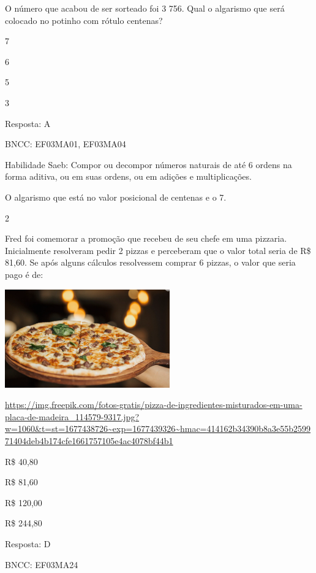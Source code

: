 \begin{escolha}
{\begin{escolha}
{O número que acabou de ser sorteado foi 3 756. Qual o algarismo que será
colocado no potinho com rótulo centenas?

\begin{escolha}

\item
  7
\item
  6
\item
  5
\item
  3
\end{escolha}

Resposta: A

BNCC: EF03MA01, EF03MA04

Habilidade Saeb: Compor ou decompor números naturais de até 6 ordens na
forma aditiva, ou em suas ordens, ou em adições e multiplicações.

O algarismo que está no valor posicional de centenas e o 7.

\num{2}

Fred foi comemorar a promoção que recebeu de seu chefe em uma pizzaria.
Inicialmente resolveram pedir 2 pizzas e perceberam que o valor total
seria de R\$ 81,60. Se após alguns cálculos resolvessem comprar 6
pizzas, o valor que seria pago é de:

\includegraphics[width=2.80000in,height=1.66867in]{media/image131.png}

\url{https://img.freepik.com/fotos-gratis/pizza-de-ingredientes-misturados-em-uma-placa-de-madeira_114579-9317.jpg?w=1060\&t=st=1677438726~exp=1677439326~hmac=414162b34390b8a3e55b259971404deb4b174cfe1661757105e4ac4078bf44b1}

\begin{escolha}

\item
  R\$ 40,80
\item
  R\$ 81,60
\item
  R\$ 120,00
\item
  R\$ 244,80
\end{escolha}

Resposta: D

BNCC: EF03MA24

}
\end{escolha}}
\end{escolha}
